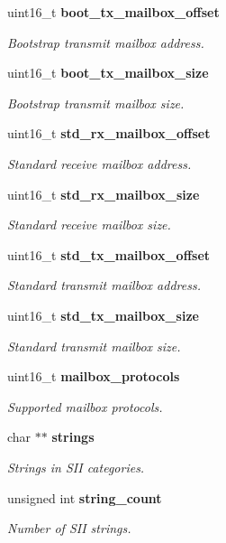 \begin{DoxyCompactItemize}
uint16\-\_\-t {\bf boot\-\_\-tx\-\_\-mailbox\-\_\-offset}
\begin{DoxyCompactList}\small\item\em \-Bootstrap transmit mailbox address. \end{DoxyCompactList}\item 
uint16\-\_\-t {\bf boot\-\_\-tx\-\_\-mailbox\-\_\-size}
\begin{DoxyCompactList}\small\item\em \-Bootstrap transmit mailbox size. \end{DoxyCompactList}\item 
uint16\-\_\-t {\bf std\-\_\-rx\-\_\-mailbox\-\_\-offset}
\begin{DoxyCompactList}\small\item\em \-Standard receive mailbox address. \end{DoxyCompactList}\item 
uint16\-\_\-t {\bf std\-\_\-rx\-\_\-mailbox\-\_\-size}
\begin{DoxyCompactList}\small\item\em \-Standard receive mailbox size. \end{DoxyCompactList}\item 
uint16\-\_\-t {\bf std\-\_\-tx\-\_\-mailbox\-\_\-offset}
\begin{DoxyCompactList}\small\item\em \-Standard transmit mailbox address. \end{DoxyCompactList}\item 
uint16\-\_\-t {\bf std\-\_\-tx\-\_\-mailbox\-\_\-size}
\begin{DoxyCompactList}\small\item\em \-Standard transmit mailbox size. \end{DoxyCompactList}\item 
uint16\-\_\-t {\bf mailbox\-\_\-protocols}
\begin{DoxyCompactList}\small\item\em \-Supported mailbox protocols. \end{DoxyCompactList}\item 
char $\ast$$\ast$ {\bf strings}
\begin{DoxyCompactList}\small\item\em \-Strings in \-S\-I\-I categories. \end{DoxyCompactList}\item 
unsigned int {\bf string\-\_\-count}
\begin{DoxyCompactList}\small\item\em \-Number of \-S\-I\-I strings. \end{DoxyCompactList}\item 
$$
\end{DoxyCompactItemize}
